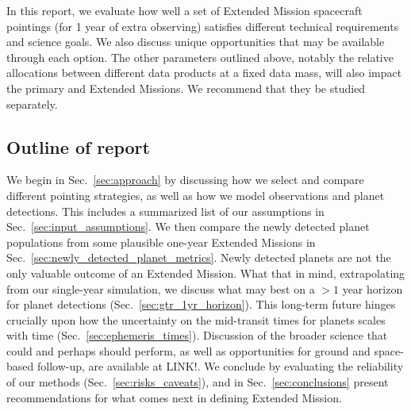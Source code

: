 In this report, we evaluate how well a set of Extended Mission spacecraft pointings (for 1 year of extra observing) satisfies different technical requirements and science goals. 
We also discuss unique opportunities that may be available through each option.
The other parameters outlined above, notably the relative allocations between different data products at a fixed data mass, will also impact the primary and Extended Missions. We recommend that they be studied separately.


\subsection{Outline of report}
We begin in Sec.~\ref{sec:approach} by discussing how we select and compare different pointing strategies, as well as how we model \tesss observations and planet detections.
This includes a summarized list of our assumptions in Sec.~\ref{sec:input_assumptions}.
We then compare the newly detected planet populations from some plausible one-year Extended Missions in Sec.~\ref{sec:newly_detected_planet_metrics}. 
Newly detected planets are not the only valuable outcome of an Extended Mission.
What that in mind, extrapolating from our single-year simulation, we discuss what may best on a $>1$ year horizon for planet detections (Sec.~\ref{sec:gtr_1yr_horizon}).
This long-term future hinges crucially upon how the uncertainty on the mid-transit times for \tess planets scales with time (Sec.~\ref{sec:ephemeris_times}).
Discussion of the broader science that \tess could and perhaps should perform, as well as opportunities for ground and space-based follow-up, are available at LINK!.
We conclude by evaluating the reliability of our methods (Sec.~\ref{sec:risks_caveats}), and in Sec.~\ref{sec:conclusions} present recommendations for what comes next in defining \tesss Extended Mission.
